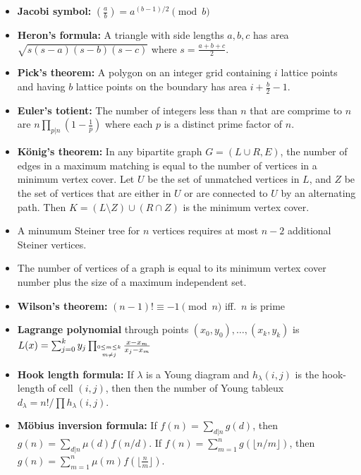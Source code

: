 \documentclass[9pt,a4paper,twocolumn,landscape,oneside]{amsart}
\begin{document}
\begin{multicols*}{3}
        \begin{itemize}[leftmargin=*]
            \item \textbf{Jacobi symbol:} $\left(\frac{a}{b}\right) = a^{(b-1)/2} \pmod{b}$
            \item \textbf{Heron's formula:} A triangle with side lengths
                $a,b,c$ has area $\sqrt{s(s-a)(s-b)(s-c)}$ where $s =
                \frac{a+b+c}{2}$.
            \item \textbf{Pick's theorem:} A polygon on an integer grid
                containing $i$ lattice points and having $b$ lattice points on
                the boundary has area $i + \frac{b}{2} - 1$.
            \item \textbf{Euler's totient:} The number of integers less than
                $n$ that are comprime to $n$ are $n\prod_{p|n}\left(1 - \frac{1}{p}\right)$
                where each $p$ is a distinct prime factor of $n$.
            \item \textbf{König's theorem:} In any bipartite graph $G=(L\cup R,E)$, the number
                of edges in a maximum matching is equal to the number of
                vertices in a minimum vertex cover. Let $U$ be the set of
                unmatched vertices in $L$, and $Z$ be the set of vertices that
                are either in $U$ or are connected to $U$ by an alternating
                path. Then $K=(L\setminus Z)\cup(R\cap Z)$ is the minimum
                vertex cover.
            \item A minumum Steiner tree for $n$ vertices requires at most $n-2$ additional Steiner vertices.
            \item The number of vertices of a graph is equal to its minimum
                vertex cover number plus the size of a maximum independent set.
            \item \textbf{Wilson's theorem:} $(n-1)! \equiv -1 \pmod{n}$ iff.\ $n$ is prime
            \item \textbf{Lagrange polynomial} through points $(x_0,y_0),\ldots,(x_k,y_k)$ is $L(x) = \sum_{j=0}^k y_j \prod_{\shortstack{$\scriptscriptstyle 0\leq m \leq k$ \\ $\scriptscriptstyle m\neq j$}} \frac{x-x_m}{x_j - x_m}$
            \item \textbf{Hook length formula:} If $\lambda$ is a Young diagram and $h_{\lambda}(i,j)$ is the hook-length of cell $(i,j)$, then then the number of Young tableux $d_{\lambda} = n!/\prod h_{\lambda}(i,j)$.
            \item \textbf{Möbius inversion formula:} If $f(n) = \sum_{d|n} g(d)$, then $g(n) = \sum_{d|n} \mu(d) f(n/d)$. If $f(n) = \sum_{m=1}^n g(\lfloor n/m\rfloor)$, then $g(n) = \sum_{m=1}^n \mu(m)f(\lfloor\frac{n}{m}\rfloor)$.

\end{itemize}
\end{multicols*}
\end{document}
